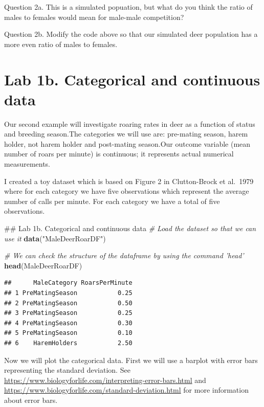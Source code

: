 \documentclass[]{book}
\newenvironment{Shaded}{\begin{snugshade}}{\end{snugshade}}
\newcommand{\CommentTok}[1]{\textcolor[rgb]{0.56,0.35,0.01}{\textit{#1}}}
\newcommand{\KeywordTok}[1]{\textcolor[rgb]{0.13,0.29,0.53}{\textbf{#1}}}
\newcommand{\NormalTok}[1]{#1}
\newcommand{\StringTok}[1]{\textcolor[rgb]{0.31,0.60,0.02}{#1}}
\begin{document}
Question 2a. This is a simulated popuation, but what do you think the ratio of males to females would mean for male-male competition?

Question 2b. Modify the code above so that our simulated deer population has a more even ratio of males to females.

\hypertarget{lab-1b.-categorical-and-continuous-data}{%
\section*{Lab 1b. Categorical and continuous data}\label{lab-1b.-categorical-and-continuous-data}}

Our second example will investigate roaring rates in deer as a function of status and breeding season.The categories we will use are: pre-mating season, harem holder, not harem holder and post-mating season.Our outcome variable (mean number of roars per minute) is continuous; it represents actual numerical measurements.

I created a toy dataset which is based on Figure 2 in Clutton-Brock et al.~1979 where for each category we have five observations which represent the average number of calls per minute. For each category we have a total of five observations.

\begin{Shaded}
\begin{Highlighting}[]
\NormalTok{## Lab 1b. Categorical and continuous data}
\CommentTok{# Load the dataset so that we can use it }
\KeywordTok{data}\NormalTok{(}\StringTok{"MaleDeerRoarDF"}\NormalTok{)}

\CommentTok{# We can check the structure of the dataframe by using the command 'head'}
\KeywordTok{head}\NormalTok{(MaleDeerRoarDF)}
\end{Highlighting}
\end{Shaded}

\begin{verbatim}
##      MaleCategory RoarsPerMinute
## 1 PreMatingSeason           0.25
## 2 PreMatingSeason           0.50
## 3 PreMatingSeason           0.25
## 4 PreMatingSeason           0.30
## 5 PreMatingSeason           0.10
## 6    HaremHolders           2.50
\end{verbatim}

Now we will plot the categorical data. First we will use a barplot with error bars representing the standard deviation. See \url{https://www.biologyforlife.com/interpreting-error-bars.html} and \url{https://www.biologyforlife.com/standard-deviation.html} for more information about error bars.
\end{document}
